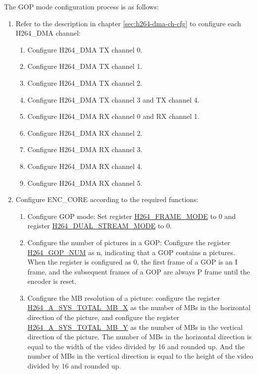 \documentclass[main\_\_EN.tex]{subfiles}
\begin{document}
The GOP mode configuration process is as follows:
\begin{enumerate}
    \item Refer to the description in chapter \ref{sec:h264-dma-ch-cfg}  to configure each H264\_DMA channel:
    \begin{enumerate}
        \item Configure H264\_DMA TX channel 0.
        \item Configure H264\_DMA TX channel 1.
        \item Configure H264\_DMA TX channel 2.
        \item Configure H264\_DMA TX channel 3 and TX channel 4.
        \item Configure H264\_DMA RX channel 0 and RX channel 1.
        \item Configure H264\_DMA RX channel 2.
        \item Configure H264\_DMA RX channel 3.
        \item Configure H264\_DMA RX channel 4.
        \item Configure H264\_DMA RX channel 5.
    \end{enumerate}
    \item\label{item:h264-gop-cfg} Configure ENC\_CORE according to the required functions:
    \begin{enumerate}
        \item Configure GOP mode: Set register \hyperref[fielddesc:H264FRAMEMODE]{H264\_FRAME\_MODE} to 0 and register \hyperref[fielddesc:H264DUALSTREAMMODE]{H264\_DUAL\_STREAM\_MODE} to 0.
        \item Configure the number of pictures in a GOP: Configure the register \hyperref[fielddesc:H264GOPNUM]{H264\_GOP\_NUM} as n, indicating that a GOP contains n pictures. When the register is configured as 0, the first frame of a GOP is an I frame, and the subsequent frames of a GOP are always P frame until the encoder is reset.
        \item Configure the MB resolution of a picture: configure the register \hyperref[fielddesc:H264ASYSTOTALMBX]{H264\_A\_SYS\_TOTAL\_MB\_X} as the number of MBs in the horizontal direction of the picture, and configure the register \hyperref[fielddesc:H264ASYSTOTALMBY]{H264\_A\_SYS\_TOTAL\_MB\_Y} as the number of MBs in the vertical direction of the picture. The number of MBs in the horizontal direction is equal to the width of the video divided by 16 and rounded up. And the number of MBs in the vertical direction is equal to the height of the video divided by 16 and rounded up.

\end{enumerate}
\end{enumerate}
\end{document}
